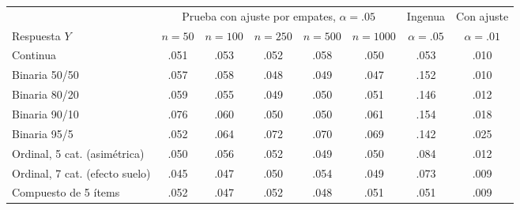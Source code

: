 \begin{tabular}{lccccccc}
\toprule
 & \multicolumn{5}{c}{Prueba con ajuste por empates, $\alpha = .05$} & Ingenua & Con ajuste \\
\cmidrule(lr){2-6}
Respuesta $Y$ & $n=50$ & $n=100$ & $n=250$ & $n=500$ & $n=1000$ & $\alpha = .05$ & $\alpha = .01$ \\
\midrule
Continua & .051 & .053 & .052 & .058 & .050 & .053 & .010 \\
Binaria 50/50 & .057 & .058 & .048 & .049 & .047 & .152 & .010 \\
Binaria 80/20 & .059 & .055 & .049 & .050 & .051 & .146 & .012 \\
Binaria 90/10 & .076 & .060 & .050 & .050 & .061 & .154 & .018 \\
Binaria 95/5 & .052 & .064 & .072 & .070 & .069 & .142 & .025 \\
Ordinal, 5 cat. (asim\'etrica) & .050 & .056 & .052 & .049 & .050 & .084 & .012 \\
Ordinal, 7 cat. (efecto suelo) & .045 & .047 & .050 & .054 & .049 & .073 & .009 \\
Compuesto de 5 \'items & .052 & .047 & .052 & .048 & .051 & .051 & .009 \\
\bottomrule
\end{tabular}
